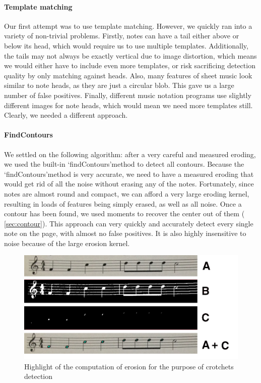\paragraph{Template matching}

Our first attempt was to use template matching. However, we quickly ran into a variety of non-trivial problems. Firstly, notes can have a tail either above or below its head, which would require us to use multiple templates. Additionally, the tails may not always be exactly vertical due to image distortion, which means we would either have to include even more templates, or risk sacrificing
detection quality by only matching against heads. Also, many features of sheet music look similar to note heads, as they are just a circular blob. This gave us a large number of false positives. Finally, different music notation programs use slightly different images for note heads, which would mean we need more templates still. Clearly, we needed a different approach.

\paragraph{FindContours}

We settled on the following algorithm: after a very careful and measured eroding, we used the built-in \lq findContours\rq  method to detect all contours. Because the \lq findContours\rq  method is very accurate, we need to have a measured eroding that would get rid of all the noise without erasing any of the notes. Fortunately, since notes are almost round and compact, we can afford a very large
eroding kernel, resulting in loads of features being simply erased, as well as all noise.
Once a contour has been found, we used moments to recover the center out of them ( \autoref{sec:contour}). This approach can very quickly and accurately detect every single note on the page, with almost no false positives. It is also highly insensitive to noise because of the large erosion kernel.
\begin{figure}[h!]
    \centering
    \includegraphics[width=1\textwidth]{./assets/highlight.png}
    \caption{Highlight of the computation of erosion for the purpose of crotchets detection}
    \label{image:highlight}
\end{figure}

